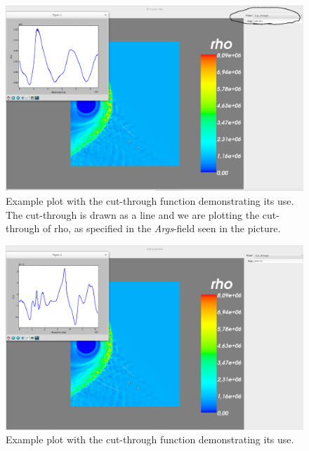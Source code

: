 \documentclass[a4paper,10pt]{article}
\begin{document}
\begin{figure}[H]
 \centering
 \includegraphics[width=\textwidth]{images/cut_through1.png}
 \caption{Example plot with the cut-through function demonstrating its use. The cut-through is drawn as a 
 line and we are plotting the cut-through of rho, as specified in the \emph{Args}-field seen in the picture.}
 \label{fig:cut_through1}
\end{figure}

\begin{figure}[H]
 \centering
 \includegraphics[width=\textwidth]{images/cut_through2.png}
 \caption{Example plot with the cut-through function demonstrating its use.}
 \label{fig:cut_through2}
\end{figure}
\end{document}
